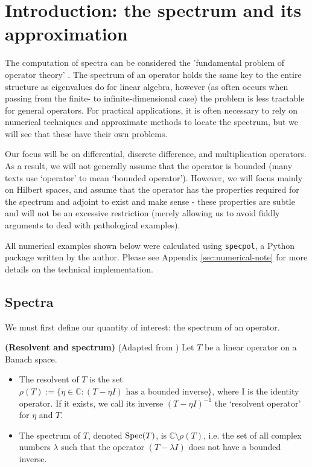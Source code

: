 \documentclass[../main.tex]{subfiles}
\begin{document}
\section{Introduction: the spectrum and its approximation}
The computation of spectra can be considered the 'fundamental problem of operator theory' \parencite{arveson2002short}. The spectrum
of an operator holds the same key to the entire structure as eigenvalues do for linear algebra, however (as often occurs when passing from 
the finite- to infinite-dimensional case) the problem is less tractable for general operators. For practical applications, it is often necessary to rely
on numerical techniques and approximate methods to locate the spectrum, but we will see that these have their own problems.

Our focus will be on differential, discrete difference, and multiplication operators. As a result, we will not generally assume that the operator is bounded (many texts use `operator' to mean `bounded operator'). However, we will focus mainly on
Hilbert spaces, and assume that the operator has the properties required for the spectrum and adjoint to exist and make sense - these properties are subtle and will not be an excessive restriction (merely allowing us to avoid fiddly arguments to deal with pathological examples).

All numerical examples shown below were calculated using \texttt{specpol}, a Python package written by the author. Please see Appendix \ref{sec:numerical-note} for more details on the technical implementation.
\subsection{Spectra}

We must first define our quantity of interest: the spectrum of an operator.
\begin{definition}{\textbf{(Resolvent and spectrum)}}
(Adapted from \parencite{edmunds2018spectral}) Let $T$ be a linear operator on a Banach space.
\begin{itemize}
\item The resolvent of $T$ is the set $\rho(T) := \{\eta \in \mathbb{C} : (T - \eta I)\text{ has a bounded inverse}\}$, where I is the identity operator. 
If it exists, we call its inverse $(T - \eta I)^{-1}$ the `resolvent operator' for $\eta$ and $T$.
\item The spectrum of $T$, denoted $\mathrm{Spec}(T)$, is $\mathbb{C} \setminus \rho(T)$, i.e. the set of all complex numbers $\lambda$ such 
that the operator $(T - \lambda I)$ does not have a bounded inverse.
\end{itemize}
\end{definition}
\end{document}
